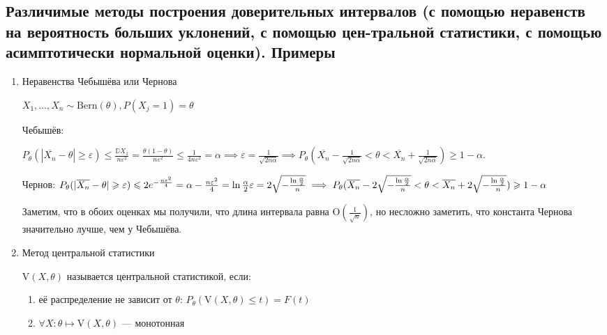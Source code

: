 \subsection{Различимые методы построения доверительных интервалов (с помощью неравенств на вероятность больших уклонений, с помощью цен-тральной статистики, с помощью асимптотически нормальной оценки). Примеры}

\begin{enumerate}
    \item Неравенства Чебышёва или Чернова
    
    $X_1, \dots, X_n \sim \text{Bern}(\theta), P(X_j = 1) = \theta$

    Чебышёв: 
    
    $P_\theta(|\overline{X_n} - \theta| \geq \varepsilon) \leq \frac{\mathbb{D}X_1}{n\varepsilon^2} = 
    \frac{\theta(1 - \theta)}{n \varepsilon^2} \leq \frac{1}{4n\varepsilon^2} = \alpha
    \implies \varepsilon = \frac{1}{\sqrt{2n\alpha}}
    \implies P_\theta(\overline{X_n} - \frac{1}{\sqrt{2n\alpha}} < \theta < \overline{X_n} + \frac{1}{\sqrt{2n\alpha}}) \geq 1 - \alpha$.

    Чернов: 
    $
    P_\theta(|\overline{X_n} - \theta| \geq \varepsilon) \leq 2e^{-\frac{n\varepsilon^2}{4}} = \alpha
    \\
    -\frac{n\varepsilon^2}{4} = \ln{\frac{\alpha}{2}}
    \\
    \varepsilon = 2\sqrt{-\frac{\ln{\frac{\alpha}{2}}}{n}}
    \\
    \implies P_\theta(\overline{X_n} - 2\sqrt{-\frac{\ln{\frac{\alpha}{2}}}{n}} < \theta < \overline{X_n} + 2\sqrt{-\frac{\ln{\frac{\alpha}{2}}}{n}}) \geq 1 - \alpha
    $

    Заметим, что в обоих оценках мы получили, что длина интервала равна $\text{O}(\frac{1}{\sqrt{n}})$,
    но несложно заметить, что константа Чернова значительно лучше, чем у Чебышёва.

    \item Метод центральной статистики
    
    \begin{definition*}
        $\text{V}(X, \theta)$ называется центральной статистикой, если:
        \begin{enumerate}
            \item её распределение не зависит
            от $\theta$: $P_\theta(\text{V}(X, \theta) \leq t) = F(t)$
            \item $\forall X \colon \theta \mapsto \text{V}(X, \theta)$ --- монотонная
        \end{enumerate} 
    \end{definition*}


\end{enumerate}
